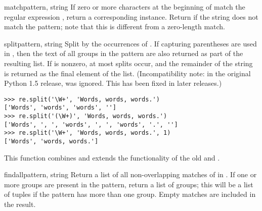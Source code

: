 \begin{funcdesc}{match}{pattern, string}
  If zero or more characters at the beginning of  match
  the regular expression , return a corresponding
   instance.  Return  if the string does not
  match the pattern; note that this is different from a zero-length
  match.

\end{funcdesc}

\begin{funcdesc}{split}{pattern, string}
  Split  by the occurrences of .  If
  capturing parentheses are used in , then the text of all
  groups in the pattern are also returned as part of the resulting list.
  If  is nonzero, at most  splits
  occur, and the remainder of the string is returned as the final
  element of the list.  (Incompatibility note: in the original Python
  1.5 release,  was ignored.  This has been fixed in
  later releases.)

\begin{verbatim}
>>> re.split('\W+', 'Words, words, words.')
['Words', 'words', 'words', '']
>>> re.split('(\W+)', 'Words, words, words.')
['Words', ', ', 'words', ', ', 'words', '.', '']
>>> re.split('\W+', 'Words, words, words.', 1)
['Words', 'words, words.']
\end{verbatim}

  This function combines and extends the functionality of
  the old  and .
\end{funcdesc}

\begin{funcdesc}{findall}{pattern, string}
  Return a list of all non-overlapping matches of  in
  .  If one or more groups are present in the pattern,
  return a list of groups; this will be a list of tuples if the
  pattern has more than one group.  Empty matches are included in the
  result.
\end{funcdesc}

